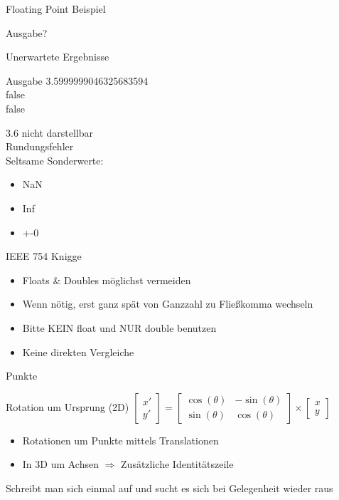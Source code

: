 \begin{frame}{Floating Point Beispiel}
	\lstset{
		language=C++,
		tabsize=2
	}
	
	Ausgabe?
\end{frame}

\begin{frame}{Unerwartete Ergebnisse}
	\begin{exampleblock}{Ausgabe}
		3.5999999046325683594 \\
		false\\
		false
	\end{exampleblock}
	3.6 nicht darstellbar \\
	Rundungsfehler \\
	Seltsame Sonderwerte:
	\begin{itemize}
		\item NaN
		\item Inf
		\item +-0
	\end{itemize}
\end{frame}

\begin{frame}{IEEE 754 Knigge}
	\begin{itemize}
		\item Floats \& Doubles möglichst vermeiden
		\item Wenn nötig, erst ganz spät von Ganzzahl zu Fließkomma wechseln
		\item Bitte KEIN float und NUR double benutzen
		\item Keine direkten Vergleiche
	\end{itemize}
\end{frame}

\begin{frame}{Punkte}
	\begin{block}{Rotation um Ursprung (2D)}
		$
		\begin{bmatrix}
			x'\\
			y'
		\end{bmatrix}
		=
		\begin{bmatrix}
			\cos(\theta) & -\sin(\theta)\\
			\sin(\theta) & \cos(\theta)
		\end{bmatrix}
		\times
		\begin{bmatrix}
			x\\
			y
		\end{bmatrix}
		$
	\end{block}
	\begin{itemize}
		\item Rotationen um Punkte mittels Translationen
		\item In 3D um Achsen $\Rightarrow$ Zusätzliche Identitätszeile
	\end{itemize}
	
	Schreibt man sich einmal auf und sucht es sich bei Gelegenheit wieder raus
\end{frame}

